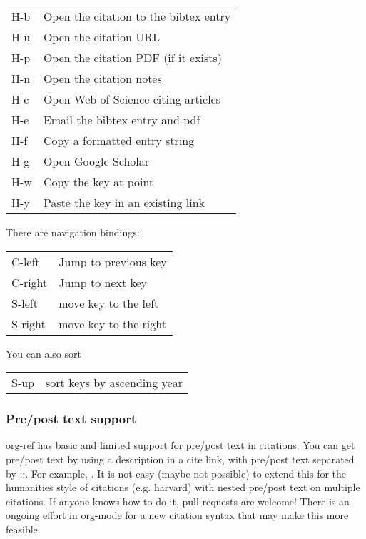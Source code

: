 \documentclass[11pt]{article}
\begin{document}
\begin{center}
\begin{tabular}{ll}
H-b & Open the citation to the bibtex entry\\
H-u & Open the citation URL\\
H-p & Open the citation PDF (if it exists)\\
H-n & Open the citation notes\\
H-c & Open Web of Science citing articles\\
H-e & Email the bibtex entry and pdf\\
H-f & Copy a formatted entry string\\
H-g & Open Google Scholar\\
H-w & Copy the key at point\\
H-y & Paste the key in an existing link\\
\end{tabular}
\end{center}

There are navigation bindings:

\begin{center}
\begin{tabular}{ll}
C-left & Jump to previous key\\
C-right & Jump to next key\\
S-left & move key to the left\\
S-right & move key to the right\\
\end{tabular}
\end{center}

You can also sort
\begin{center}
\begin{tabular}{ll}
S-up & sort keys by ascending year\\
\end{tabular}
\end{center}

\subsubsection{Pre/post text support}
\label{sec:org78cccf4}

org-ref has basic and limited support for pre/post text in citations. You can get pre/post text by using a description in a cite link, with pre/post text separated by ::. For example, \cite[See page 20][, for example]{Dominik201408}. It is not easy (maybe not possible) to extend this for the humanities style of citations (e.g. harvard) with nested pre/post text on multiple citations. If anyone knows how to do it, pull requests are welcome! There is an ongoing effort in org-mode for a new citation syntax that may make this more feasible.
\end{document}
